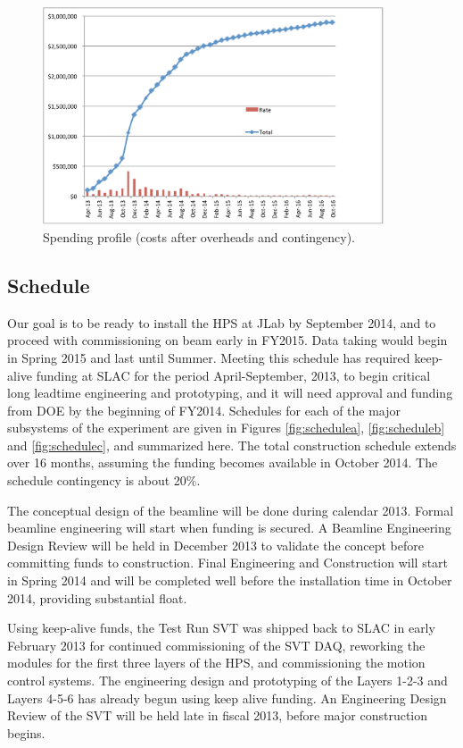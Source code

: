 \begin{figure}[ht]
\centering
\includegraphics[width=0.9\textwidth]{cost_schedule/spending} 
\caption{Spending profile (costs after overheads and contingency).}
\label{fig:spending_profile}
\end{figure}

\subsection{Schedule}
Our goal is to be ready to install the HPS at JLab by September 2014, and to proceed with commissioning on beam early in FY2015. Data taking 
would begin in Spring 2015 and last until Summer. Meeting this schedule has required keep-alive funding at SLAC for the period April-September, 2013, 
to begin critical long leadtime engineering and prototyping, and it will need  approval and funding from DOE by the beginning of FY2014. Schedules 
for each of the major subsystems of the experiment are given in Figures \ref{fig:schedulea}, \ref{fig:scheduleb} and \ref{fig:schedulec}, and summarized here. The total construction schedule extends over 16 months, 
assuming the funding becomes available in October 2014. The schedule contingency is about 20\%.
 
The conceptual design of the beamline will be done during calendar 2013. Formal beamline engineering will start when funding is secured. A Beamline Engineering 
Design Review will be held in December 2013 to validate the concept before committing funds to construction. 
Final Engineering and Construction will start in Spring 2014 and will be completed well before the installation time in October 2014, providing substantial float. 

Using keep-alive funds, the Test Run SVT was shipped back to SLAC in early February 2013 for continued commissioning of the SVT DAQ, reworking the 
modules for the first three layers of the HPS, and commissioning the motion control systems. The engineering design and prototyping of the Layers 1-2-3 and 
Layers 4-5-6 has already begun using keep alive funding. An Engineering Design Review of the SVT will be held late in fiscal 2013, before major construction
begins. 

